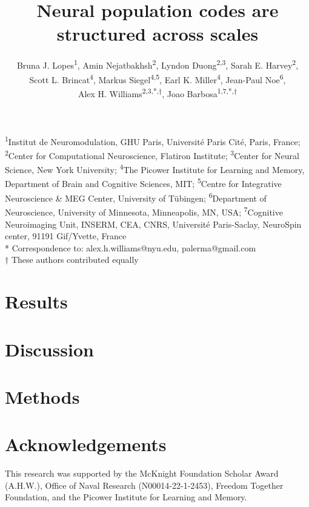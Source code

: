 \documentclass[11pt]{article}
\title{Neural population codes are structured across scales}
\author{
     Bruna J. Lopes\textsuperscript{1},
    Amin Nejatbakhsh\textsuperscript{2},
    Lyndon Duong\textsuperscript{2,3},
    Sarah E. Harvey\textsuperscript{2},\\
    Scott L. Brincat\textsuperscript{4},
    Markus Siegel\textsuperscript{4,5},
    Earl K. Miller\textsuperscript{4},
    Jean-Paul Noe\textsuperscript{6},\\
    Alex H. Williams\textsuperscript{2,3,*,$\dagger$},
    Joao Barbosa\textsuperscript{1,7,*,$\dagger$}
}
\begin{document}
\date{}
\maketitle


\begin{center}
{\small
\textsuperscript{1}Institut de Neuromodulation, GHU Paris, Université Paris Cité, Paris, France;
\textsuperscript{2}Center for Computational Neuroscience, Flatiron Institute;
\textsuperscript{3}Center for Neural Science, New York University;
\textsuperscript{4}The Picower Institute for Learning and Memory, Department of Brain and Cognitive Sciences, MIT;
\textsuperscript{5}Centre for Integrative Neuroscience \& MEG Center, University of Tübingen;
\textsuperscript{6}Department of Neuroscience, University of Minnesota, Minneapolis, MN, USA;
\textsuperscript{7}Cognitive Neuroimaging Unit, INSERM, CEA, CNRS, Université Paris-Saclay, NeuroSpin center, 91191 Gif/Yvette, France\\[4pt]
* Correspondence to: alex.h.williams@nyu.edu, palerma@gmail.com\\
$\dagger$ These authors contributed equally\\}

\end{center}








\section{Results}
% 

%




\section{Discussion}

\section{Methods}\label{sec:methods}


\section{Acknowledgements}
This research was supported by the McKnight Foundation Scholar Award (A.H.W.), Office of Naval Research (N00014-22-1-2453), Freedom Together Foundation, and the Picower Institute for Learning and Memory.


\clearpage
\begin{refcontext}[sorting=nyt]
\printbibliography
\end{refcontext}
\end{document}
